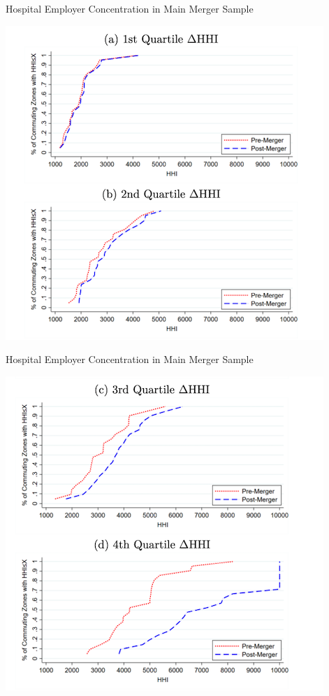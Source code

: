 \documentclass{beamer}
\begin{document}
\begin{frame}{Hospital Employer Concentration in Main Merger Sample}
\centering

\includegraphics[width=\linewidth,
                 height=0.85\textheight,
                 keepaspectratio]{hhi_cdf12}
\end{frame}

\begin{frame}{Hospital Employer Concentration in Main Merger Sample}
\centering

\includegraphics[width=\linewidth,
                 height=0.85\textheight,
                 keepaspectratio]{hhi_cdf34}
\end{frame}
\end{document}
